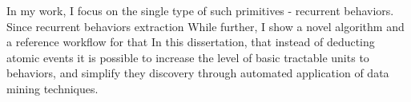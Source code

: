 In my work, I focus on the single type of such primitives - recurrent behaviors. 
Since recurrent behaviors extraction While further, I show a novel algorithm and a reference workflow for that In this dissertation, that instead of deducting atomic events it is
possible to increase the level of basic tractable units to behaviors, and simplify they discovery through automated
application of data mining techniques.





